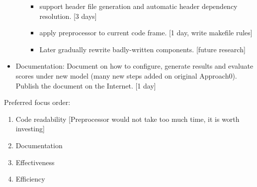 \documentclass[12pt]{article} %
\begin{document}
\begin{itemize}
\begin{itemize}
\begin{itemize}
				\item support header file generation and automatic header dependency resolution. [3 days]
				\item apply preprocessor to current code frame. [1 day, write makefile rules]
				\item Later gradually rewrite badly-written components. [future research]
			\end{itemize}
		\end{itemize}
		\item Documentation: Document on how to configure, generate results and evaluate scores under new model (many new steps added on original Approach0). Publish the document on the Internet. [1 day]
\end{itemize}

Preferred focus order:
\begin{enumerate}
\item Code readability [Preprocessor would not take too much time, it is worth investing]
\item Documentation
\item Effectiveness 
\item Efficiency 
\end{enumerate}
\end{document}
